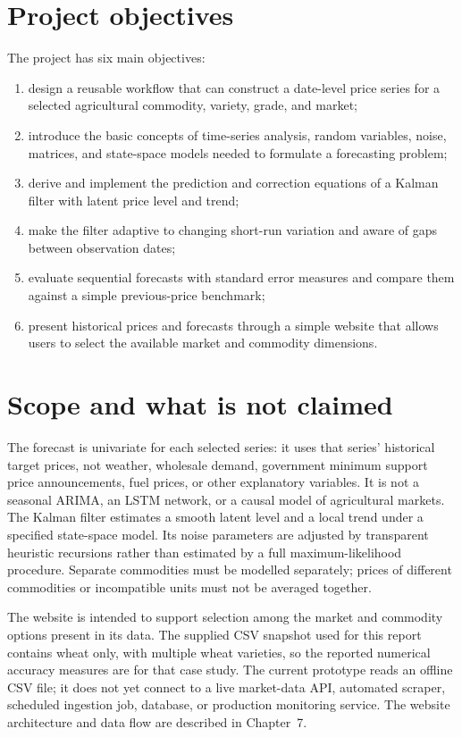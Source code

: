 \documentclass[12pt,a4paper,oneside]{report}
\numberwithin{equation}{chapter}
\numberwithin{figure}{chapter}
\numberwithin{table}{chapter}
\theoremstyle{definition}
\theoremstyle{plain}
\newcommand{\1}{\mathbf{1}}
\begin{document}
\section{Project objectives}
The project has six main objectives:
\begin{enumerate}
  \item design a reusable workflow that can construct a date-level price series for a selected agricultural commodity, variety, grade, and market;
  \item introduce the basic concepts of time-series analysis, random variables, noise, matrices, and state-space models needed to formulate a forecasting problem;
  \item derive and implement the prediction and correction equations of a Kalman filter with latent price level and trend;
  \item make the filter adaptive to changing short-run variation and aware of gaps between observation dates;
  \item evaluate sequential forecasts with standard error measures and compare them against a simple previous-price benchmark;
  \item present historical prices and forecasts through a simple website that allows users to select the available market and commodity dimensions.
\end{enumerate}

\section{Scope and what is not claimed}
The forecast is univariate for each selected series: it uses that series' historical target prices, not weather, wholesale demand, government minimum support price announcements, fuel prices, or other explanatory variables. It is not a seasonal ARIMA, an LSTM network, or a causal model of agricultural markets. The Kalman filter estimates a smooth latent level and a local trend under a specified state-space model. Its noise parameters are adjusted by transparent heuristic recursions rather than estimated by a full maximum-likelihood procedure. Separate commodities must be modelled separately; prices of different commodities or incompatible units must not be averaged together.

The website is intended to support selection among the market and commodity options present in its data. The supplied CSV snapshot used for this report contains wheat only, with multiple wheat varieties, so the reported numerical accuracy measures are for that case study. The current prototype reads an offline CSV file; it does not yet connect to a live market-data API, automated scraper, scheduled ingestion job, database, or production monitoring service. The website architecture and data flow are described in Chapter~7.
\end{document}
